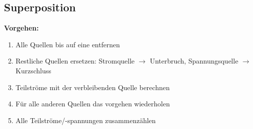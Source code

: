 \subsection{Superposition}
\textbf{Vorgehen:}
\begin{multicols}{2}
\begin{enumerate}
  \item Alle Quellen bis auf eine entfernen
  \item Restliche Quellen ersetzen: Stromquelle $\rightarrow$ Unterbruch,
  Spannungsquelle $\rightarrow$ Kurzschluss
  \item Teilströme mit der verbleibenden Quelle berechnen
  \item Für alle anderen Quellen das vorgehen wiederholen
  \item Alle Teilströme/-spannungen zusammenzählen
\end{enumerate}
\end{multicols}